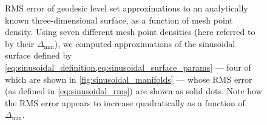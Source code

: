 \begin{figure}[htpb]
    \centering
    \caption[RMS error of geodesic level set approximations to an analytically
    known three-dimensional surface, as a function of mesh point density]
    {RMS error of geodesic level set approximations to an analytically known
    three-dimensional surface, as a function of mesh point density.
    Using seven different mesh point densities (here referred to by their
    $\Delta_{\min}$), we computed approximations of the sinusoidal surface
    defined by \cref{eq:sinusoidal_definition,eq:sinusoidal_surface_params} ---
    four of which are shown in \cref{fig:sinusoidal_manifolds} --- whose
    RMS error (as defined in \cref{eq:sinusoidal_rms}) are shown as solid
    dots. Note how the RMS error appears to increase quadratically
    as a function of $\Delta_{\min}$.
}
    \label{fig:sinusoidal_manifold_errors}
\end{figure}

